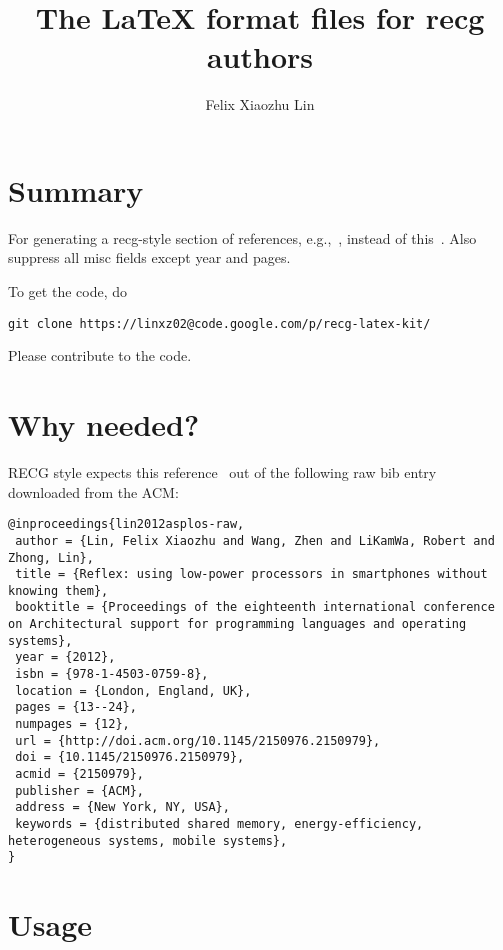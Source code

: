 \documentclass[letterpaper,11pt]{article}
\title{The \LaTeX{} format files for recg authors}
\author{Felix Xiaozhu Lin}
\begin{document}
\maketitle

\section{Summary}

For generating a recg-style section of references, e.g.,~\cite{lin2012asplos}, instead of this~\cite{lin2012asplos-raw}.
Also suppress all misc fields except year and pages.

To get the code, do
\begin{lstlisting}
git clone https://linxz02@code.google.com/p/recg-latex-kit/
\end{lstlisting}

Please contribute to the code.

\section{Why needed?}
RECG style expects this reference~\cite{lin2012asplos} out of the following raw bib entry downloaded from the ACM:

\begin{lstlisting}
@inproceedings{lin2012asplos-raw,
 author = {Lin, Felix Xiaozhu and Wang, Zhen and LiKamWa, Robert and Zhong, Lin},
 title = {Reflex: using low-power processors in smartphones without knowing them},
 booktitle = {Proceedings of the eighteenth international conference on Architectural support for programming languages and operating systems},
 year = {2012},
 isbn = {978-1-4503-0759-8},
 location = {London, England, UK},
 pages = {13--24},
 numpages = {12},
 url = {http://doi.acm.org/10.1145/2150976.2150979},
 doi = {10.1145/2150976.2150979},
 acmid = {2150979},
 publisher = {ACM},
 address = {New York, NY, USA},
 keywords = {distributed shared memory, energy-efficiency, heterogeneous systems, mobile systems},
} 
\end{lstlisting}

\section{Usage}
\end{document}

